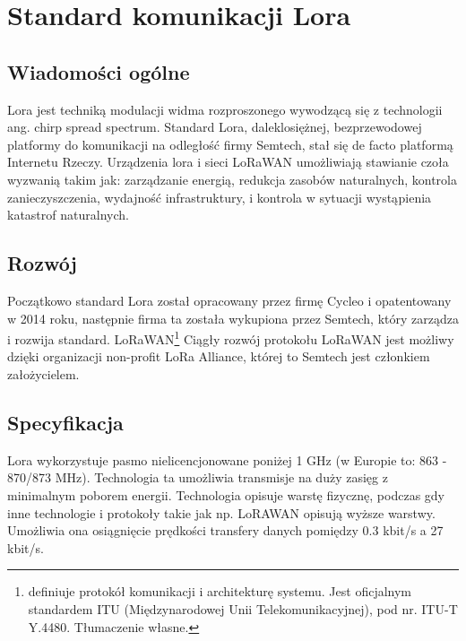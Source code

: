 \newpage %
\section{Standard komunikacji Lora}
\subsection{Wiadomości ogólne}
Lora\cite{lora} jest techniką modulacji widma rozproszonego wywodzącą się z technologii ang. chirp spread spectrum.
Standard Lora, daleklosiężnej, bezprzewodowej platformy do komunikacji na odległość firmy Semtech, stał się de facto platformą Internetu Rzeczy.
Urządzenia lora i sieci LoRaWAN umożliwiają stawianie czoła wyzwanią takim jak: zarządzanie energią, redukcja zasobów naturalnych, kontrola zanieczyszczenia, wydajność infrastruktury, i kontrola w sytuacji wystąpienia katastrof naturalnych.
\subsection{Rozwój}
Początkowo standard Lora został opracowany przez firmę Cycleo i opatentowany w 2014 roku, następnie firma ta została wykupiona przez Semtech, który zarządza i rozwija standard.
LoRaWAN\footnote{definiuje protokół komunikacji i architekturę systemu. Jest oficjalnym standardem ITU (Międzynarodowej Unii Telekomunikacyjnej), pod nr. ITU-T Y.4480. Tłumaczenie własne.}
Ciągły rozwój protokołu LoRaWAN jest możliwy dzięki organizacji non-profit LoRa Alliance, której to Semtech jest członkiem założycielem.
\subsection{Specyfikacja}
Lora wykorzystuje pasmo nielicencjonowane poniżej 1 GHz (w Europie to: 863 - 870/873 MHz). Technologia ta umożliwia transmisje na duży zasięg z minimalnym poborem energii. Technologia opisuje warstę fizycznę, podczas gdy inne technologie i protokoły takie jak np. LoRAWAN opisują wyższe warstwy. Umożliwia ona osiągnięcie prędkości transfery danych pomiędzy 0.3 kbit/s a 27 kbit/s.
